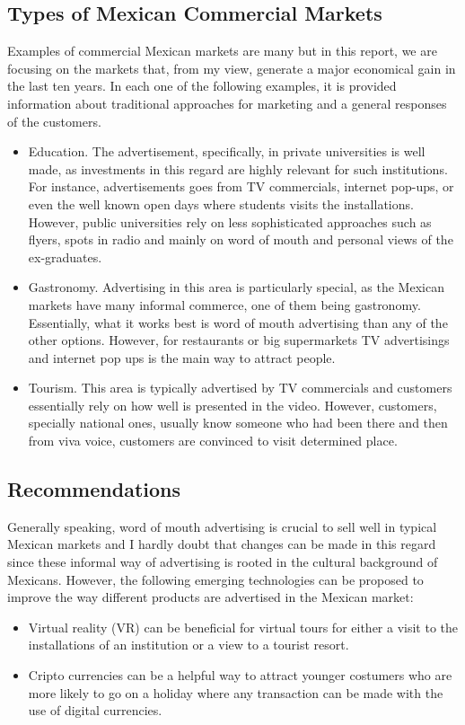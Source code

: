 \documentclass[10pt]{article}
\begin{document}
\subsection{Types of Mexican Commercial Markets}
Examples of commercial Mexican markets are many but in this report,
we are focusing  on the markets that, from my view, generate a 
major economical gain in the last ten years. 
In each one of the following examples, it is provided information about 
traditional approaches for marketing and a general responses of the customers.
\begin{itemize}
\item Education. The advertisement, specifically, in private universities 
is well made, as investments in this regard are highly relevant for such 
institutions.
For instance, advertisements goes from TV commercials, internet pop-ups,
or even the well known open days where students visits the installations.
However, public universities rely on less sophisticated approaches such 
as flyers, spots in radio and mainly on word of mouth and personal 
views of the ex-graduates.
\item Gastronomy. Advertising in this area is particularly special,
as the Mexican markets have many informal commerce, one of them being gastronomy.
Essentially, what it works best is word of mouth advertising than any of the 
other options. However, for restaurants or big supermarkets
TV advertisings and internet pop ups is the main way to attract people.
\item Tourism. This area is typically advertised by TV commercials
 and customers essentially rely on how well is presented in the video. 
However, customers, specially national ones, usually know someone 
who had been there and then from viva voice, customers are convinced 
to visit determined place.
\end{itemize}

\subsection{Recommendations}
Generally speaking, word of mouth advertising is crucial to sell well
in typical Mexican markets and I hardly doubt that changes can be made
in this regard since these informal way of advertising is rooted in 
the cultural background of Mexicans. However, the following
emerging technologies can be proposed to improve the way different 
products are advertised in the Mexican market:
\begin{itemize}
\item Virtual reality (VR) can be beneficial for virtual tours
for either a visit to the installations of an institution
or a view to a tourist resort.
\item Cripto currencies can be a helpful way to attract younger
costumers who are more likely to go on a holiday where 
any transaction can be made with the use of digital currencies.
\end{itemize}
\end{document}
